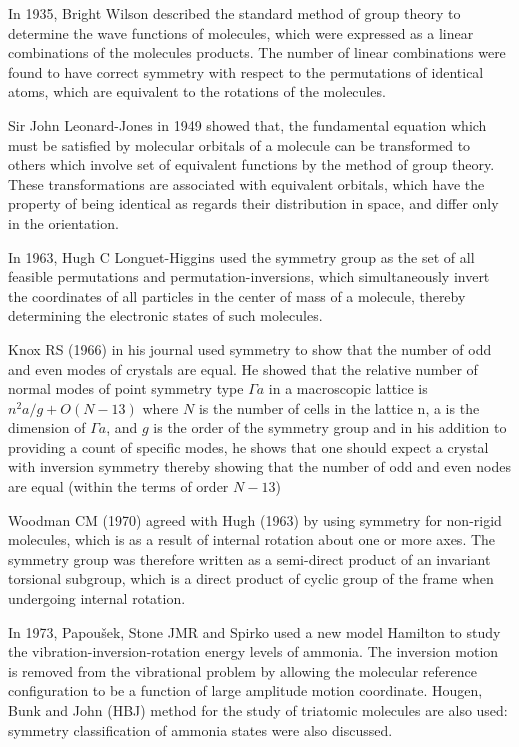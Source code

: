 \documentclass[a4paper, 12pt, openany]{report}
\begin{document}
	In 1935,  Bright Wilson described the standard method of group theory to \linebreak determine the wave functions of molecules, which were expressed as a linear combinations of the molecules products. The number of linear combinations were found to have correct symmetry with respect to the permutations of identical atoms, which are equivalent to the rotations of the molecules.
	
	Sir John Leonard-Jones in 1949 showed that, the fundamental  equation which must be satisfied by molecular orbitals of a molecule can be transformed to others which involve set of equivalent functions by the method of group theory. These transformations are associated with  equivalent orbitals, which have the property of being identical as regards their  distribution in space, and differ only in the orientation.
	
    In 1963, Hugh C Longuet-Higgins used the symmetry group as the set of all feasible permutations and permutation-inversions, which simultaneously invert the coordinates of all particles in the center of mass of a molecule, thereby determining the electronic states of such molecules.
	
    Knox RS (1966) in his journal used symmetry to show that the number of odd and even modes of crystals are equal. He showed that the relative number of normal modes of point symmetry type $\Gamma a$ in a macroscopic lattice is $n^2a/g+O(N-13)$ where  $N$ is the number of cells in the lattice n, a is the dimension of $\Gamma a$, and $g$ is the order of the symmetry group and in his addition to providing a count of specific modes, he shows that one should expect a crystal with inversion symmetry thereby showing that the number of odd and even nodes are equal (within the terms of order $N-13$)
	
	Woodman CM (1970) agreed with Hugh (1963) by using symmetry for \linebreak non-rigid molecules, which is as a result of internal rotation about one or more axes. The symmetry group was therefore written as a semi-direct product of an invariant torsional subgroup, which is a direct product of cyclic group of the frame when undergoing internal rotation.
	
	In 1973, Papoušek, Stone JMR and Spirko used a new model \break Hamilton to study the vibration-inversion-rotation energy levels of ammonia. The inversion motion is removed from the vibrational problem by allowing the molecular reference  configuration to be a function of large amplitude \break motion coordinate. Hougen, Bunk and John (HBJ) method for the study of \break triatomic molecules are also used: symmetry classification of ammonia states were also discussed.
	
\end{document}
